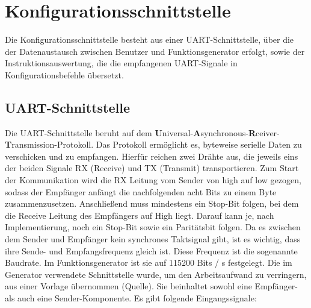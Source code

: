 \section{Konfigurationsschnittstelle}
Die Konfigurationsschnittstelle  besteht aus einer
UART-Schnittstelle, über die der Datenaustausch zwischen Benutzer und
Funktionsgenerator erfolgt, sowie der Instruktionsauswertung, die die
empfangenen UART-Signale in Konfigurationsbefehle übersetzt.
\subsection{UART-Schnittstelle}
Die UART-Schnittstelle beruht auf dem
\textbf{U}niversal-\textbf{A}synchronous-\textbf{R}ceiver-\textbf{T}ransmission-Protokoll.
Das Protokoll ermöglicht es, byteweise serielle Daten zu verschicken und zu
empfangen. Hierfür reichen zwei Drähte aus, die jeweils eins der beiden Signale
RX (Receive) und TX (Transmit) transportieren. Zum Start der Kommunikation wird
die RX Leitung vom Sender von high auf low gezogen, sodass der Empfänger anfängt
die nachfolgenden acht Bits zu einem Byte zusammenzusetzen. Anschließend muss
mindestens ein Stop-Bit folgen, bei dem die Receive Leitung des Empfängers auf
High liegt. Darauf kann je, nach Implementierung, noch ein Stop-Bit sowie
ein Paritätsbit folgen. Da es zwischen dem Sender und Empfänger kein synchrones
Taktsignal gibt, ist es wichtig, dass ihre Sende- und Empfangsfrequenz gleich
ist. Diese Frequenz ist die sogenannte Baudrate. Im Funktionsgenerator ist sie
auf 115200 Bits / s festgelegt. Die im Generator verwendete Schnittstelle wurde,
um den Arbeitsaufwand zu verringern, aus einer Vorlage übernommen (Quelle). Sie
beinhaltet sowohl eine Empfänger- als auch eine Sender-Komponente. Es gibt
folgende Eingangssignale:
